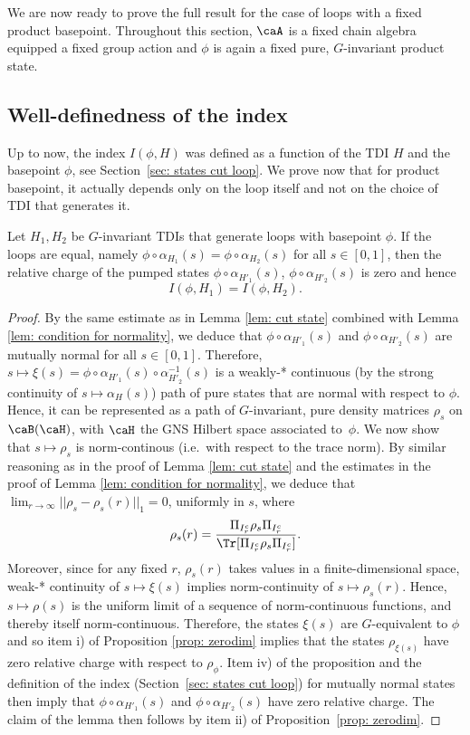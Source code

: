 We are now ready to prove the full result for the case of loops with a fixed product basepoint. Throughout this section, $\caA$ is a fixed chain algebra equipped a fixed group action and $\phi$ is again a fixed pure, $G$-invariant product state. 



\subsection{Well-definedness of the index}
Up to now, the index $I(\phi,H)$ was defined as a function of the TDI $H$ and the basepoint $\phi$, see Section~\ref{sec: states cut loop}. We prove now that for product basepoint, it actually depends only on the loop itself and not on the choice of TDI that generates it. 
\begin{lemma}\label{lem: index indep of h}
	Let $H_1,H_2$ be $G$-invariant TDIs that generate loops with basepoint $\phi$. If the loops are equal, namely $\phi\circ\alpha_{H_1}(s)=\phi\circ\alpha_{H_2}(s)$ for all $s\in [0,1]$, then the relative charge of the pumped states  $\phi\circ\alpha_{H'_1}(s)$, $\phi\circ\alpha_{H'_2}(s)$ is zero and hence 
	$$
	I(\phi,H_1)=I(\phi,H_2).
	$$ 
\end{lemma}
\begin{proof}
	By the same estimate as in Lemma \ref{lem: cut state} combined with Lemma \ref{lem: condition for normality}, we deduce that  $\phi\circ\alpha_{H'_1}(s)$ and $\phi\circ\alpha_{H'_2}(s)$ are mutually normal for all $s\in [0,1]$.  Therefore, $s\mapsto\xi(s)=\phi\circ\alpha_{H'_1}(s) \circ \alpha^{-1}_{H'_2}(s) $ is a weakly-* continuous (by the strong continuity of $s\mapsto \alpha_H(s)$) path of pure states that are normal with respect to $\phi$. Hence, it can be represented as a path of $G$-invariant, pure density matrices $\rho_s$  on $\caB(\caH)$, with $\caH$ the GNS Hilbert space associated to~$\phi$.  We now show that $s\mapsto \rho_{s}$ is norm-continous (i.e.\ with respect to the trace norm).   By similar reasoning as in the proof of Lemma \ref{lem: cut state} and the estimates in the proof of Lemma \ref{lem: condition for normality}, we deduce that 
	$\lim_{r\to\infty}||\rho_s- \rho_s(r)||_1 =0 $,  uniformly in $s$, where 
	$$ \rho_s(r)=  \frac{\Pi_{I_{r}^c}\rho_s \Pi_{I_{r}^c}}{\Tr[\Pi_{I_{r}^c}\rho_s \Pi_{I_{r}^c}]}.$$
	Moreover, since for any fixed $r$, $\rho_s(r)$ takes values in a finite-dimensional space, weak-* continuity of $s\mapsto\xi(s)$ implies norm-continuity of $s\mapsto \rho_s(r)$. Hence, $s\mapsto \rho(s)$ is the uniform limit of a sequence of norm-continuous functions, and thereby itself norm-continuous. Therefore, the states $\xi(s)$ are $G$-equivalent to $\phi$ and so item i) of Proposition \ref{prop: zerodim} implies that the states $\rho_{\xi(s)}$ have zero relative charge with respect to $\rho_\phi$. Item iv) of the proposition and the definition of the index (Section~\ref{sec: states cut loop}) for mutually normal states then imply that $\phi\circ\alpha_{H'_1}(s)$ and $\phi\circ\alpha_{H'_2}(s)$ have zero relative charge.  
	The claim of the lemma then follows by item ii) of Proposition~\ref{prop: zerodim}.
\end{proof} 

